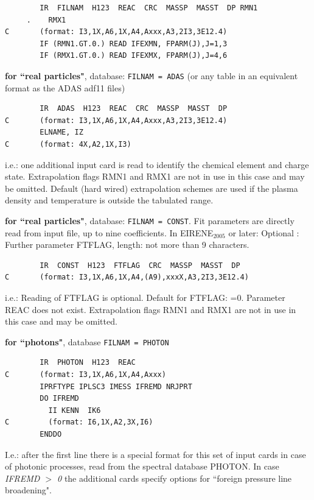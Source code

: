 \begin{lstlisting}
        IR  FILNAM  H123  REAC  CRC  MASSP  MASST  DP RMN1
     .    RMX1
C       (format: I3,1X,A6,1X,A4,Axxx,A3,2I3,3E12.4)
        IF (RMN1.GT.0.) READ IFEXMN, FPARM(J),J=1,3
        IF (RMX1.GT.0.) READ IFEXMX, FPARM(J),J=4,6
\end{lstlisting} 

\textbf{for ``real particles"}, database: \lstinline|FILNAM = ADAS| (or any table
in an equivalent format as the \ac{ADAS} adf11 files) 

\begin{lstlisting}
        IR  ADAS  H123  REAC  CRC  MASSP  MASST  DP
C       (format: I3,1X,A6,1X,A4,Axxx,A3,2I3,3E12.4)
        ELNAME, IZ
C       (format: 4X,A2,1X,I3)
\end{lstlisting} 

i.e.: one additional input card is read to identify the chemical element and
charge state.
Extrapolation flags RMN1 and RMX1 are not in use in this case and may be
omitted.
Default (hard wired) extrapolation schemes are used if the plasma density and
temperature is outside the tabulated range.
\vspace{0.3cm}

\textbf{for ``real particles"}, database: \lstinline|FILNAM = CONST|.
Fit parameters are directly read from input file, up to nine coefficients.
In EIRENE$_{2005}$ or later: Optional : Further parameter FTFLAG, length: not
more than 9 characters.

\begin{lstlisting}
        IR  CONST  H123  FTFLAG  CRC  MASSP  MASST  DP
C       (format: I3,1X,A6,1X,A4,(A9),xxxX,A3,2I3,3E12.4)
\end{lstlisting}

i.e.: Reading of FTFLAG is optional.
Default for FTFLAG: =0.
Parameter REAC does not exist.
Extrapolation flags RMN1 and RMX1 are not in use in this case and may be
omitted.

\vspace{0.3cm}
\textbf{for ``photons"}, database \lstinline|FILNAM = PHOTON| 

\begin{lstlisting}
        IR  PHOTON  H123  REAC
C       (format: I3,1X,A6,1X,A4,Axxx)
        IPRFTYPE IPLSC3 IMESS IFREMD NRJPRT
        DO IFREMD
          II KENN  IK6
C         (format: I6,1X,A2,3X,I6)
        ENDDO
\end{lstlisting} 

I.e.: after the first line there is a special format for this set of input
cards in case of photonic processes, read from the spectral database PHOTON.
In case \emph{IFREMD $>$ 0} the additional cards specify options for ``foreign
pressure line broadening".

